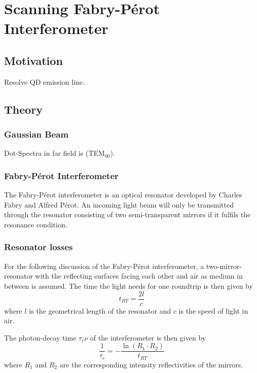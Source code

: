\chapter{Scanning Fabry-Pérot Interferometer}

\section{Motivation}

Resolve QD emission line.

\section{Theory}

\subsection{Gaussian Beam}

Dot-Spectra in far field is (TEM$_{00}$).

\subsection{Fabry-Pérot Interferometer}

The Fabry-Pérot interferometer is an optical resonator developed by Charles Fabry and Alfred Pérot.
An incoming light beam will only be transmitted through the resonator consisting of two semi-transparent mirrors if it fulfils the resonance condition.\cite{kaldewey_coherent_2017}

\subsection{Resonator losses}
For the following discussion of the Fabry-Pérot interferometer, a two-mirror-resonator with the reflecting surfaces facing each other and air as medium in between is assumed. The time the light needs for one roundtrip is then given by ~\cite{ismail_fabry-perot_2016}
\begin{equation}
t_{RT} = \frac{2l}{c}
\end{equation}
where $l$ is the geometrical length of the resonator and $c$ is the speed of light in air. 

The photon-decay time $\tau_c{\nu}$ of the interferometer is then given by
\begin{equation}
\frac{1}{\tau_c} = - \frac{\ln(R_1 \cdot R_2)}{t_{RT}}
\end{equation}
where $R_1$ and $R_2$ are the corresponding intensity reflectivities of the mirrors.

